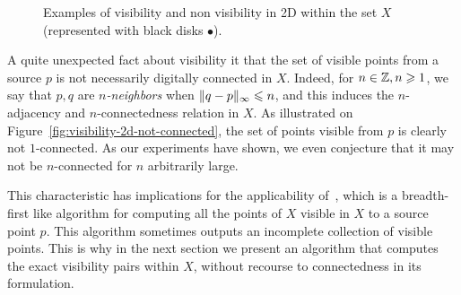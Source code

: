     \begin{figure}[t]
      \centering
      
      \caption{Examples of visibility and non visibility in 2D within
        the set $X$ (represented with black disks $\bullet$).}
      \label{fig:visibility-2d}
    \end{figure}


    A quite unexpected fact about visibility it that the set of
    visible points from a source $p$ is not necessarily digitally
    connected in $X$. Indeed, for $n \in \mathbb{Z}, n \geqslant 1$, we say that
    $p,q$ are \emph{$n$-neighbors} when $\|q-p\|_\infty \leqslant n$, and
    this induces the $n$-adjacency and $n$-connectedness relation in
    $X$. As illustrated on
    Figure~\ref{fig:visibility-2d-not-connected}, the set of points
    visible from $p$ is clearly not $1$-connected. As our experiments
    have shown, we even conjecture that it may not be $n$-connected
    for $n$ arbitrarily large.

    This characteristic has implications for the applicability of~\cite[Algorithm 3]{lachaud:2022-jmiv}, which is a breadth-first
    like algorithm for computing all the points of $X$ visible in $X$
    to a source point $p$. This algorithm sometimes outputs an
    incomplete collection of visible points. This is why in the next
    section we present an algorithm that computes the exact visibility
    pairs within $X$, without recourse to connectedness in its formulation.


